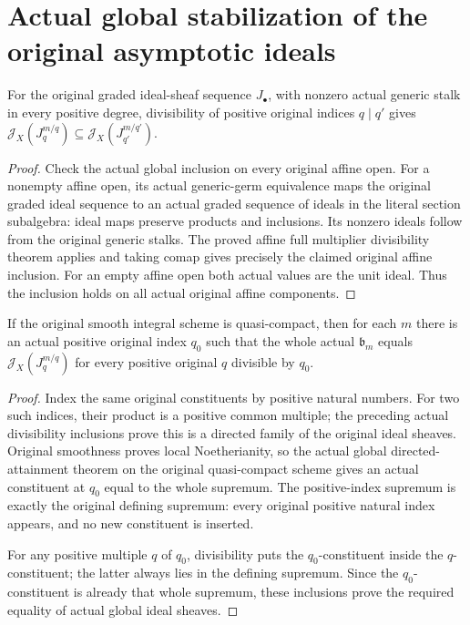 \section{Actual global stabilization of the original asymptotic ideals}

\begin{theorem}\label{thm:sc0-original-global-multiplier-divisibility}
\leanok
{}
For the original graded ideal-sheaf sequence $J_\bullet$, with
nonzero actual generic stalk in every positive degree, divisibility
of positive original indices $q\mid q'$ gives
$\mathcal J_X(J_q^{m/q})\subseteq\mathcal J_X(J_{q'}^{m/q'})$.
\end{theorem}
\begin{proof}
Check the actual global inclusion on every original affine open.
For a nonempty affine open, its actual generic-germ equivalence
maps the original graded ideal sequence to an actual graded
sequence of ideals in the literal section subalgebra: ideal maps
preserve products and inclusions. Its nonzero ideals follow from
the original generic stalks. The proved affine full multiplier
divisibility theorem applies and taking comap gives precisely the
claimed original affine inclusion. For an empty affine open both
actual values are the unit ideal. Thus the inclusion holds on all
actual original affine components.
\end{proof}

\begin{theorem}\label{thm:sc0-original-global-asymptotic-stabilization}
\leanok
{}
If the original smooth integral scheme is quasi-compact, then for
each $m$ there is an actual positive original index $q_0$ such that
the whole actual $\mathfrak b_m$ equals
$\mathcal J_X(J_q^{m/q})$ for every positive original $q$ divisible
by $q_0$.
\end{theorem}
\begin{proof}
Index the same original constituents by positive natural numbers.
For two such indices, their product is a positive common multiple;
the preceding actual divisibility inclusions prove this is a
directed family of the original ideal sheaves. Original smoothness
proves local Noetherianity, so the actual global directed-attainment
theorem on the original quasi-compact scheme gives an actual
constituent at $q_0$ equal to the whole supremum. The positive-index
supremum is exactly the original defining supremum: every original
positive natural index appears, and no new constituent is inserted.

For any positive multiple $q$ of $q_0$, divisibility puts the
$q_0$-constituent inside the $q$-constituent; the latter always lies
in the defining supremum. Since the $q_0$-constituent is already
that whole supremum, these inclusions prove the required equality
of actual global ideal sheaves.
\end{proof}
